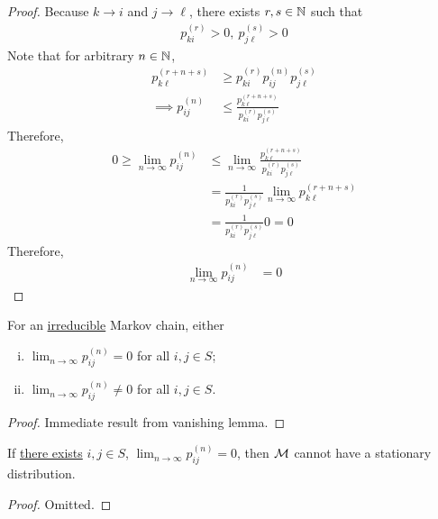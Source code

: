 \documentclass{article}
\newcommand{\upn}[0]{^{(n)}}
\begin{document}
	\begin{proof}
		Because $k \to i$ and $j \to \ell$, there exists $r, s \in \mathbb{N}$ such that
		\begin{align}
			p_{ki}^{(r)} > 0,\ 
			p_{j\ell}^{(s)} > 0
		\end{align}
		Note that for arbitrary $n \in \mathbb{N}$,
		\begin{align}
			p_{k \ell}^{(r+n+s)}
			&\geq p_{ki}^{(r)} p_{ij}^{(n)} p_{j\ell}^{(s)} \\
			\implies p_{ij}^{(n)}
			&\leq \frac{p_{k \ell}^{(r+n+s)}}{p_{ki}^{(r)}p_{j\ell}^{(s)}}
		\end{align}
		Therefore, 
		\begin{align}
			0 \geq \lim_{n \to \infty} p_{ij}\upn &\leq \lim_{n \to \infty} \frac{p_{k \ell}^{(r+n+s)}}{p_{ki}^{(r)}p_{j\ell}^{(s)}} \\
			&= \frac{1}{{p_{ki}^{(r)}p_{j\ell}^{(s)}}} \lim_{n \to \infty} {p_{k \ell}^{(r+n+s)}} \\
			&= \frac{1}{{p_{ki}^{(r)}p_{j\ell}^{(s)}}} 0 = 0 
		\end{align}
		Therefore,
		\begin{align}
			\lim_{n \to \infty} p_{ij}\upn &= 0
		\end{align}
	\end{proof}
	
	\begin{corollary}
		For an \ul{irreducible} Markov chain, either
		\begin{enumerate}[(i)]
			\item $\lim _{n \rightarrow \infty} p_{i j}^{(n)}=0$ for all $i, j \in S$;
			\item $\lim _{n \rightarrow \infty} p_{i j}^{(n)}\neq 0$ for all $i, j \in S$.
		\end{enumerate}
	\end{corollary}
	
	\begin{proof}
		Immediate result from vanishing lemma.
	\end{proof}
	
	\begin{corollary}
		If \ul{there exists} $i, j \in S$, $\lim_{n \to \infty} p_{ij}\upn = 0$, then $\mathcal{{M}}$ cannot have a stationary distribution.
	\end{corollary}
	
	\begin{proof}
		Omitted.
	\end{proof}
	
\end{document}
